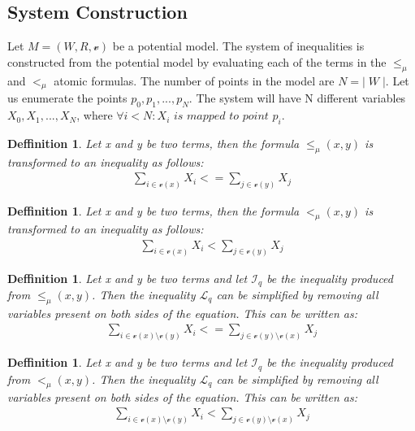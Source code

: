 \documentclass{article}
\newtheorem{defn}[theorem]{Deffinition}
\newcommand{\vE}{\mathscr{v}}
\begin{document}
		\leavevmode\newline
		\subsection{System Construction}
		Let $M = (W, R, \vE)$ be a potential model. The system of inequalities is constructed from the potential model by evaluating each
		of the terms in the $\le_\mu$ and $<_\mu$ atomic formulas. The number of points in the model are $N = | \; W \; |$. Let us enumerate the points
		$p_0, p_1, ..., p_N$. The system will have N different variables $X_0, X_1, ..., X_N$, 
		where $\forall i < N: X_i \textit{ is mapped to point }p_i$.

		\begin{defn}
			Let x and y be two terms, then the formula $\le_\mu(x, y)$ is transformed to an inequality as follows:
			\begin{align*}
				\sum_{i \in \vE(x)} X_i <= \sum_{j \in \vE(y)} X_j
			\end{align*}
		\end{defn}

		\begin{defn}
			Let x and y be two terms, then the formula $<_\mu(x, y)$ is transformed to an inequality as follows:
			\begin{align*}
				\sum_{i \in \vE(x)} X_i < \sum_{j \in \vE(y)} X_j
			\end{align*}
		\end{defn}

		\begin{defn}
			Let x and y be two terms and let $\mathscr{I}_q$ be the inequality produced from $\le_\mu(x, y)$. Then the inequality $\mathscr{L}_q$ can be simplified 
			by removing all variables present on both sides of the equation. This can be written as:
			\begin{align*}
				\sum_{i \in \vE(x) \setminus \vE(y)} X_i <= \sum_{j \in \vE(y) \setminus \vE(x)} X_j
			\end{align*}
		\end{defn}

		\begin{defn}
			Let x and y be two terms and let $\mathscr{I}_q$ be the inequality produced from $<_\mu(x, y)$. Then the inequality $\mathscr{L}_q$ can be simplified 
			by removing all variables present on both sides of the equation. This can be written as:
			\begin{align*}
				\sum_{i \in \vE(x) \setminus \vE(y)} X_i < \sum_{j \in \vE(y) \setminus \vE(x)} X_j
			\end{align*}
		\end{defn}
\end{document}
